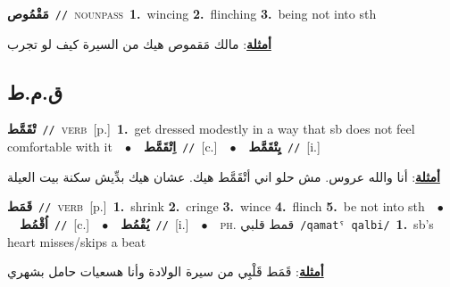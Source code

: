 \documentclass[10pt,a4paper,twoside]{article} %
\begin{document}
\begin{multicols}{2}
{\setlength\topsep{0pt}\textbf{\foreignlanguage{arabic}{مَقْمُوص}}\ {\color{gray}\texttt{//}\color{black}}\ \textsc{noun\textunderscore pass}\ \textbf{1.}~wincing  \textbf{2.}~flinching  \textbf{3.}~being not into sth\  \begin{flushright}\color{gray}\foreignlanguage{arabic}{\textbf{\underline{\foreignlanguage{arabic}{أمثلة}}}: مالك مَقموص هيك من السيرة كيف لو تجرب}\end{flushright}\color{black}} \vspace{2mm}

\vspace{-3mm}
\subsection*{\color{blue}\foreignlanguage{arabic}{ق.م.ط}\color{blue}{}} 

{\setlength\topsep{0pt}\textbf{\foreignlanguage{arabic}{تْقَمَّط}}\ {\color{gray}\texttt{//}\color{black}}\ \textsc{verb}\ [p.]\ \textbf{1.}~get dressed modestly in a way that sb does not feel comfortable with it\ \ $\bullet$\ \ \setlength\topsep{0pt}\textbf{\foreignlanguage{arabic}{اِتْقَمَّط}}\ {\color{gray}\texttt{//}\color{black}}\ [c.]\ \ $\bullet$\ \ \setlength\topsep{0pt}\textbf{\foreignlanguage{arabic}{يِتْقَمَّط}}\ {\color{gray}\texttt{//}\color{black}}\ [i.]\  \begin{flushright}\color{gray}\foreignlanguage{arabic}{\textbf{\underline{\foreignlanguage{arabic}{أمثلة}}}: أنا والله عروس. مش حلو اني أتْقَمَّط هيك. عشان هيك بدِّيش سكنة بيت العيلة}\end{flushright}\color{black}} \vspace{2mm}

{\setlength\topsep{0pt}\textbf{\foreignlanguage{arabic}{قَمَط}}\ {\color{gray}\texttt{//}\color{black}}\ \textsc{verb}\ [p.]\ \textbf{1.}~shrink  \textbf{2.}~cringe  \textbf{3.}~wince  \textbf{4.}~flinch  \textbf{5.}~be not into sth\ \ $\bullet$\ \ \setlength\topsep{0pt}\textbf{\foreignlanguage{arabic}{اُقْمُط}}\ {\color{gray}\texttt{//}\color{black}}\ [c.]\ \ $\bullet$\ \ \setlength\topsep{0pt}\textbf{\foreignlanguage{arabic}{يُقْمُط}}\ {\color{gray}\texttt{//}\color{black}}\ [i.]\ \ $\bullet$\ \ \textsc{ph.} \color{gray} \foreignlanguage{arabic}{قمط قلبي}\color{black}\ {\color{gray}\texttt{/{\sffamily qamatˤ qalbi}/}\color{black}}\ \textbf{1.}~sb's heart misses/skips a beat\  \begin{flushright}\color{gray}\foreignlanguage{arabic}{\textbf{\underline{\foreignlanguage{arabic}{أمثلة}}}: قَمَط قَلْبِي من سيرة الولادة وأنا هسعيات حامل بشهري}\end{flushright}\color{black}} \vspace{2mm}


\end{multicols}
\end{document}
